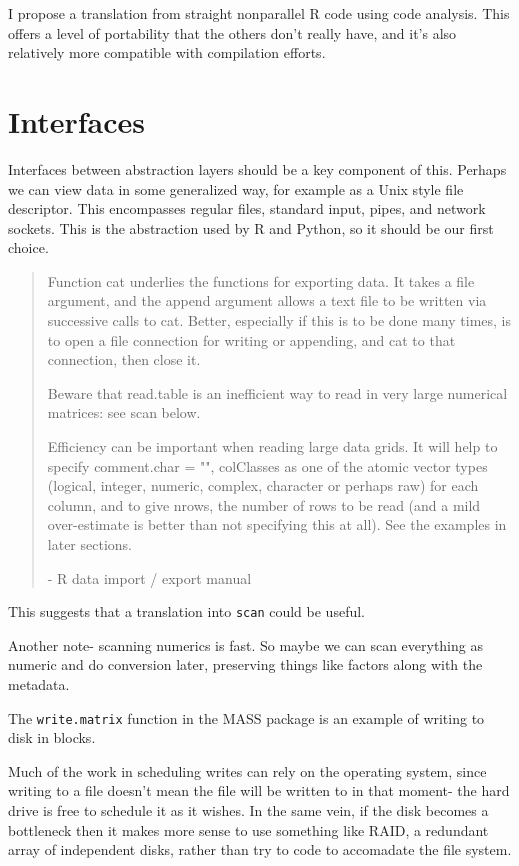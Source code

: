\documentclass[12pt]{article}
\begin{document}
I propose a translation from straight nonparallel R code using code
analysis. This offers a level of portability that the others don't really
have, and it's also relatively more compatible with compilation efforts.

\section{Interfaces}

Interfaces between abstraction layers should be a key component of this.
Perhaps we can view data in some generalized way, for example as a Unix
style file descriptor. This encompasses regular files, standard input,
pipes, and network sockets. This is the abstraction used by R and Python,
so it should be our first choice.

\begin{quote}

Function cat underlies the functions for exporting data. It takes a file
    argument, and the append argument allows a text file to be written via
    successive calls to cat. Better, especially if this is to be done many
    times, is to open a file connection for writing or appending, and cat
    to that connection, then close it.

Beware that read.table is an inefficient way to read in very large
numerical matrices: see scan below.

Efficiency can be important when reading large data grids. It will help to
    specify comment.char = "", colClasses as one of the atomic vector types
    (logical, integer, numeric, complex, character or perhaps raw) for each
    column, and to give nrows, the number of rows to be read (and a mild
    over-estimate is better than not specifying this at all). See the
    examples in later sections.

- R data import / export manual
\end{quote}

This suggests that a translation into \texttt{scan} could be useful.

Another note- scanning numerics is fast. So maybe we can scan everything as
numeric and do conversion later, preserving things like factors along with
the metadata.

The \texttt{write.matrix} function in the MASS package is an example of
writing to disk in blocks.

Much of the work in scheduling writes can rely on the operating system,
since writing to a file doesn't mean the file will be written to in that
moment- the hard drive is free to schedule it as it wishes. In the same
vein, if the disk becomes a bottleneck then it makes more sense to use
something like RAID, a redundant array of independent disks, rather than
try to code to accomadate the file system.
\end{document}
